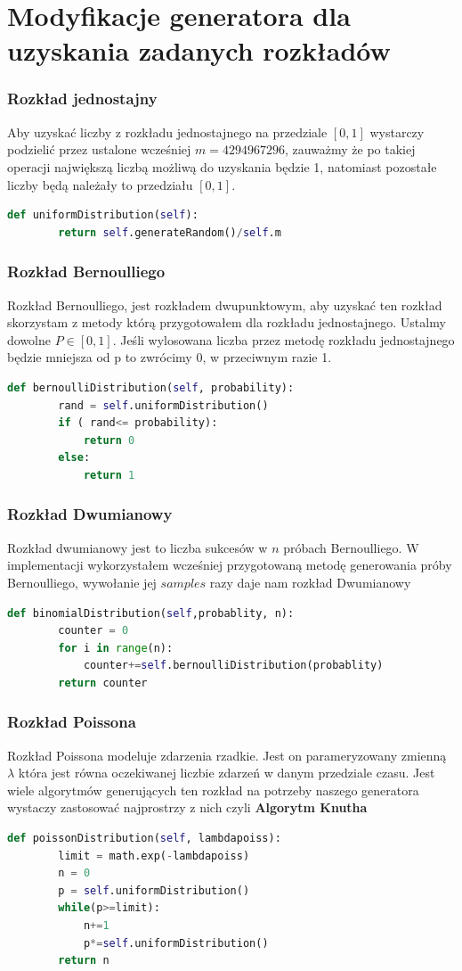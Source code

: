 \documentclass[9pt]{beamer}
\begin{document}
\section{Modyfikacje generatora dla uzyskania zadanych rozkładów}
\begin{frame}[containsverbatim]
  \frametitle{Rozkład jednostajny}
  Aby uzyskać liczby z rozkładu jednostajnego na przedziale $[0,1]$ wystarczy podzielić przez ustalone wcześniej $m=4294967296$, zauważmy że po takiej operacji największą liczbą możliwą do uzyskania będzie 1, natomiast pozostałe liczby będą należały to przedziału $[0,1]$.
  \begin{lstlisting}[language=Python, caption=Metoda rozkładu jednostajnego]
    def uniformDistribution(self):
        return self.generateRandom()/self.m
    \end{lstlisting}
\end{frame}
\begin{frame}[containsverbatim]
  
  \frametitle{Rozkład Bernoulliego}
  Rozkład Bernoulliego, jest rozkładem dwupunktowym, aby uzyskać ten rozkład skorzystam z metody którą przygotowałem dla rozkładu jednostajnego. Ustalmy dowolne $P\in [0,1]$. Jeśli wylosowana liczba przez metodę rozkładu jednostajnego będzie mniejsza od p to zwrócimy 0, w przeciwnym razie 1.
  \begin{lstlisting}[language=Python, caption=Metoda rozkładu Bernoulliego]
    def bernoulliDistribution(self, probability):
        rand = self.uniformDistribution()
        if ( rand<= probability):
            return 0
        else:
            return 1
    \end{lstlisting}
\end{frame}
\begin{frame}[containsverbatim]
  \frametitle{Rozkład Dwumianowy}
  Rozkład dwumianowy jest to liczba sukcesów w $n$ próbach Bernoulliego. W implementacji wykorzystałem wcześniej przygotowaną metodę generowania próby Bernoulliego, wywołanie jej $samples$ razy daje nam rozkład Dwumianowy
  \begin{lstlisting}[language=Python, caption=Metoda rozkładu Dwumianowego]
    def binomialDistribution(self,probablity, n):
        counter = 0
        for i in range(n):
            counter+=self.bernoulliDistribution(probablity)
        return counter
    \end{lstlisting}
\end{frame}
\begin{frame}[containsverbatim]
  \frametitle{Rozkład Poissona}
  Rozkład Poissona modeluje zdarzenia rzadkie. Jest on parameryzowany zmienną $\lambda$ która jest równa oczekiwanej liczbie zdarzeń w danym przedziale czasu. Jest wiele algorytmów generujących ten rozkład na potrzeby naszego generatora wystaczy zastosować najprostrzy z nich czyli \textbf{ Algorytm Knutha}
  \begin{lstlisting}[language=Python, caption=Metoda rozkładu Poissona]
    def poissonDistribution(self, lambdapoiss):
        limit = math.exp(-lambdapoiss)
        n = 0
        p = self.uniformDistribution()
        while(p>=limit):
            n+=1
            p*=self.uniformDistribution()
        return n
    \end{lstlisting}
\end{frame}
\end{document}
